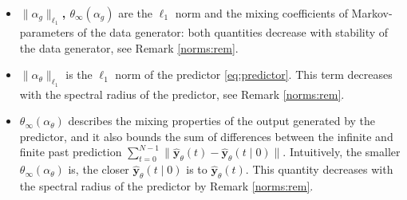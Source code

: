 \documentclass{article}
\def\rvu{{\mathbf{i}}}
\def\rvu{{\mathbf{u}}}
\def\rvy{{\mathbf{y}}}
\newcommand{\e}{\mathbf{e}}
\newcommand{\y}{\mathbf{y}}
\newcommand{\bE}{\mathbf{E}}
\newcommand{\Gp}{G_{\theta}}
\begin{document}
\begin{itemize}
    \item 
\textbf{$\|\alpha_g\|_{\ell_1}$, $\theta_{\infty}(\alpha_g)$}
are the $\ell_1$  norm  and %
the mixing coefficients of Markov-parameters of the data
generator:  both quantities decrease with stability of the data generator,
see Remark \ref{norms:rem}.

\item \textbf{$\|\alpha_{\theta}\|_{\ell_1}$} is the $\ell_1$ norm of the predictor
 \eqref{eq:predictor}.  %
This term decreases with the spectral radius of 
the predictor, see Remark \ref{norms:rem}.  %
\item \textbf{$\theta_{\infty}(\alpha_{\theta})$  } 
describes the mixing properties of the output generated
by the predictor, and it also bounds the sum of differences between 
the infinite and finite past prediction $\sum_{t=0}^{N-1} \|\hat{\rvy}_{\theta}(t)-\hat{\rvy}_{\theta}(t\mid 0)\|$.
Intuitively, the smaller $\theta_{\infty}(\alpha_{\theta})$ is, the closer
$\hat{\rvy}_\theta(t \mid 0)$ is to $\hat{\rvy}_{\theta}(t)$.
This quantity decreases with the spectral radius of the predictor by Remark \ref{norms:rem}.


\end{itemize}
\end{document}

